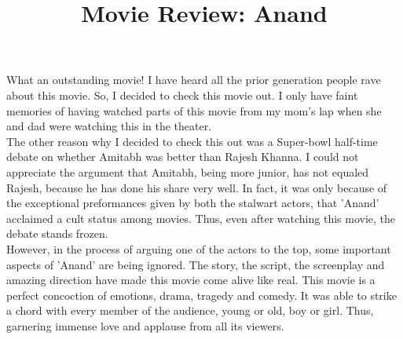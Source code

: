 \documentclass[12pt, a4paper]{article}
\title{Movie Review: Anand}
\author{}
\date{}
\begin{document}
\maketitle

What an outstanding movie! I have heard all the prior generation people rave about this movie. So, I decided to check this movie out. I only have faint memories of having watched parts of this movie from my mom's lap when she and dad were watching this in the theater.\\

The other reason why I decided to check this out was a Super-bowl half-time debate on whether Amitabh was better than Rajesh Khanna. I could not appreciate the argument that Amitabh, being more junior, has not equaled Rajesh, because he has done his share very well. In fact, it was only because of the exceptional preformances given by both the stalwart actors, that 'Anand' acclaimed a cult status among movies. Thus, even after watching this movie, the debate stands frozen.\\

However, in the process of arguing one of the actors to the top, some important aspects of 'Anand' are being ignored. The story, the script, the screenplay and amazing direction have made this movie come alive like real. This movie is a perfect concoction of emotions, drama, tragedy and comedy. It was able to strike a chord with every member of the audience, young or old, boy or girl. Thus, garnering immense love and applause from all its viewers.\\
\end{document}
